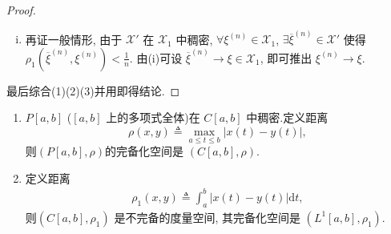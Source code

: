 \documentclass[../../main.tex]{subfiles}%
\begin{document}
\begin{proof}
\begin{enumerate}[(1)]
\begin{enumerate}[(i)]
\item 再证一般情形, 由于 $\mathscr{X}'$ 在 $\mathscr{X}_1$ 中稠密, $\forall\xi^{(n)}\in\mathscr{X}_1$, $\exists\overline{\xi}^{(n)}\in\mathscr{X}'$ 使得 $\rho_1(\overline{\xi}^{(n)},\xi^{(n)})<\frac{1}{n}$. 由(i)可设 $\overline{\xi}^{(n)}\to\xi\in\mathscr{X}_1$, 即可推出 $\xi^{(n)}\to\xi$.
\end{enumerate}
\end{enumerate}
最后综合(1)(2)(3)并用即得结论.
\end{proof}

\begin{proposition}[常见度量空间的完备化空间]\label{proposition:常见度量空间的完备化空间}
\begin{enumerate}[(1)]
\item $P[a,b]$ ($[a,b]$ 上的多项式全体)在 $C[a,b]$ 中稠密.定义距离
$$\rho(x,y)\triangleq \max_{a\leqslant t\leqslant b}|x(t)-y(t)|,$$
则$(P[a,b],\rho)$的完备化空间是 $(C[a,b],\rho)$.

\item 定义距离
\begin{align*}
\rho _1(x,y)\triangleq \int_a^b{\left| x\left( t \right) -y\left( t \right) \right|\mathrm{d}t},
\end{align*}
则$(C[a,b],\rho_1)$ 是不完备的度量空间, 其完备化空间是 $(L^1[a,b],\rho_1)$.
\end{enumerate}
\end{proposition}
\end{document}
